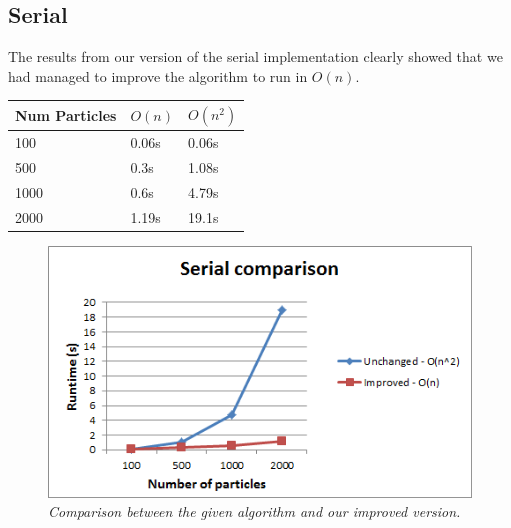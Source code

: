 \documentclass[11pt,a4paper]{article}
\begin{document}
\subsection{Serial}
The results from our version of the serial implementation clearly showed that we had managed to improve the algorithm to run in $O(n)$. \\
\begin{center}
    \begin{tabular}{ | l | l | l |}
    \hline
    Num Particles & $O(n)$ & $O(n^{2})$  \\ \hline
    100 & 0.06s & 0.06s  \\ \hline
    500 & 0.3s & 1.08s  \\ \hline
    1000 & 0.6s & 4.79s  \\ \hline
    2000 & 1.19s & 19.1s \\
    \hline
    \end{tabular}
\end{center}
\begin{figure}[htb]
\centering
\includegraphics[scale=1]{pics/serial.png}
\caption{\emph{Comparison between the given algorithm and our improved version.}}
\label{fig:gird}
\end{figure}
\end{document}
